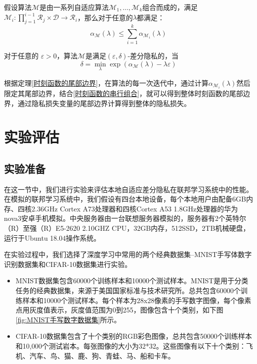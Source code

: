 \begin{theorem}[时刻函数的串行组合]\label{时刻函数的串行组合}
假设算法$\mathcal{M}$是由一系列自适应算法$\mathcal{M}_{1}, \ldots, \mathcal{M}_{k}$组合而成的，满足$\mathcal{M}_{i}: \prod_{j=1}^{i-1} \mathcal{R}_{j} \times \mathcal{D} \rightarrow \mathcal{R}_{i}$，那么对于任意的$\lambda$都满足：
$$
\alpha_{\mathcal{M}}(\lambda) \leq \sum_{i=1}^{k} \alpha_{\mathcal{M}_{i}}(\lambda)
$$
\end{theorem}

\begin{theorem}[时刻函数的尾部边界]\label{时刻函数的尾部边界}
对于任意的 $\varepsilon>0$，算法$\mathcal{M}$是满足$(\varepsilon, \delta)$-差分隐私的，当
$$
\delta=\min _{\lambda} \exp \left(\alpha_{\mathcal{M}}(\lambda)-\lambda \varepsilon\right)
$$
\end{theorem}

根据定理\ref{时刻函数的尾部边界}，在算法的每一次迭代中，通过计算$\alpha_{\mathcal{M}_{i}}(\lambda)$然后限定其尾部边界，结合\ref{时刻函数的串行组合}，就可以得到整体时刻函数的尾部边界，通过隐私损失变量的尾部边界计算得到整体的隐私损失。


\section{实验评估}
\subsection{实验准备}
在这一节中，我们进行实验来评估本地自适应差分隐私在联邦学习系统中的性能。在模拟的联邦学习系统中，我们假设有四台本地设备，每个本地用户由配备6GB内存、四核2.36GHz Cortex A73处理器和四核Cortex A53 1.8GHz处理器的华为nova3安卓手机模拟。中央服务器由一台联想服务器模拟的，服务器有2个英特尔（R）至强（R）E5-2620 2.10GHZ CPU，32GB内存，512SSD，2TB机械硬盘，运行于Ubuntu 18.04操作系统。

在实验过程中，我们选择了深度学习中常用的两个经典数据集--MNIST手写体数字识别数据集和CIFAR-10数据集进行实验。
\begin{itemize}
\item MNIST数据集包含60000个训练样本和10000个测试样本。MNIST是用于分类任务的经典数据集，来源于美国国家标准与技术研究所。总共包含60000个训练样本和10000个测试样本。每个样本为28x28像素的手写数字图像，每个像素点用灰度值表示，灰度值范围为0到255，图像包含十个类别，如下图\ref{fig:MNIST手写数字数据集}所示。

\item CIFAR-10数据集包含了十个类别的RGB彩色图像，总共包含50000个训练样本和10,000个测试岩本。每张图像的大小为32*32。这些图像有以下十个类别：飞机、汽车、鸟、猫、鹿、狗、青蛙、马、船和卡车。

\end{itemize}



